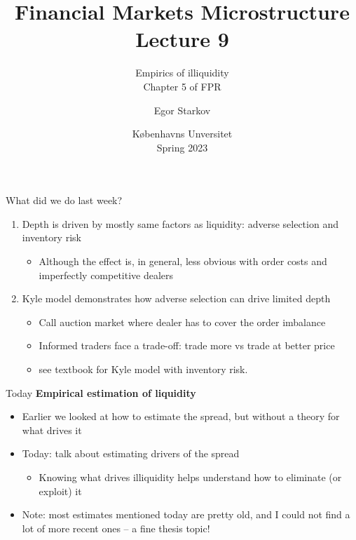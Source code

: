 \documentclass[english,10pt
,aspectratio=169
]{beamer}
\title{Financial Markets Microstructure \\ Lecture 9}
\subtitle{Empirics of illiquidity\\
	Chapter 5 of FPR}
\author{Egor Starkov}
\date{K{\o}benhavns Unversitet \\
	Spring 2023}
\begin{document}
	

\frame[plain]{\titlepage}


\begin{frame}{What did we do last week?}
	\begin{enumerate}
		\item Depth is driven by mostly same factors as liquidity: adverse selection and inventory risk
		\begin{itemize}
			\item Although the effect is, in general, less obvious with order costs and imperfectly competitive dealers
		\end{itemize}
		\item Kyle model demonstrates how adverse selection can drive limited depth
		\begin{itemize}
			\item Call auction market where dealer has to cover the order imbalance
			\item Informed traders face a trade-off: trade more vs trade at better price
			\item see textbook for Kyle model with inventory risk.
		\end{itemize}
	\end{enumerate}
\end{frame}


\begin{frame}{Today}
	\textbf{Empirical estimation of liquidity}
	\begin{itemize}
		\item Earlier we looked at how to estimate the spread, but without a theory for what drives it
		\item Today: talk about estimating drivers of the spread
		\begin{itemize}
			\item Knowing what drives illiquidity helps understand how to eliminate (or exploit) it
		\end{itemize}
		\item Note: most estimates mentioned today are pretty old, and I could not find a lot of more recent ones -- a fine thesis topic!
	\end{itemize}
\end{frame}
\end{document}
